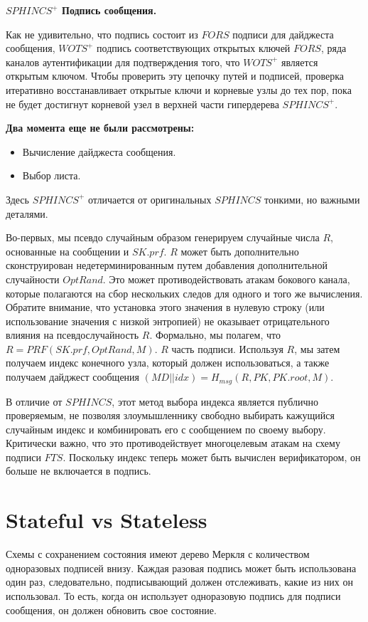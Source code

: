 \documentclass[a4paper, 14pt]{extarticle}
\begin{document}
\textbf{$SPHINCS^{+}$ Подпись сообщения.}

Как не удивительно, что подпись состоит из $FORS$ подписи для дайджеста сообщения, $WOTS^{+}$ подпись соответствующих открытых ключей $FORS$, ряда каналов аутентификации для подтверждения того, что $WOTS^{+}$ является открытым ключом. Чтобы проверить эту цепочку путей и подписей, проверка итеративно восстанавливает открытые ключи и корневые узлы до тех пор, пока не будет достигнут корневой узел в верхней части гипердерева $SPHINCS^{+}$. 
\newline

\textbf{Два момента еще не были рассмотрены:}

\begin{itemize}
    \item Вычисление дайджеста сообщения.
    \item Выбор листа.
\end{itemize}

Здесь $SPHINCS^{+}$ отличается от оригинальных $SPHINCS$ тонкими, но важными деталями.

Во-первых, мы псевдо случайным образом генерируем случайные числа $R$, основанные на сообщении и $SK.prf$. $R$ может быть дополнительно сконструирован недетерминированным путем добавления дополнительной случайности $OptRand$. Это может противодействовать атакам бокового канала, которые полагаются на сбор нескольких следов для одного и того же вычисления. Обратите внимание, что установка этого значения в нулевую строку (или использование значения с низкой энтропией) не оказывает отрицательного влияния на псевдослучайность $R$. Формально, мы полагем, что $R = PRF(SK.prf, OptRand, M)$. $R$ часть подписи. Используя $R$, мы затем получаем индекс конечного узла, который должен использоваться, а также получаем дайджест сообщения $(MD||idx) = H_{msg}(R, PK, PK.root, M)$.

В отличие от $SPHINCS$, этот метод выбора индекса является публично проверяемым, не позволяя злоумышленнику свободно выбирать кажущийся случайным индекс и комбинировать его с сообщением по своему выбору. Критически важно, что это противодействует многоцелевым атакам на схему подписи $FTS$. Поскольку индекс теперь может быть вычислен верификатором, он больше не включается в подпись.
\newpage

\section{Stateful vs Stateless}
Схемы с сохранением состояния имеют дерево Меркля с количеством одноразовых подписей внизу. Каждая разовая подпись может быть использована один раз, следовательно, подписывающий должен отслеживать, какие из них он использовал. То есть, когда он использует одноразовую подпись для подписи сообщения, он должен обновить свое состояние.
\end{document}
